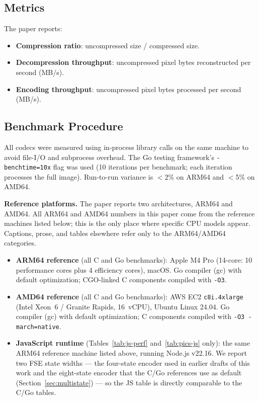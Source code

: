 \documentclass[journal]{IEEEtran}
\begin{document}
\subsection{Metrics}

The paper reports:
\begin{itemize}
  \item \textbf{Compression ratio}: uncompressed size / compressed size.
  \item \textbf{Decompression throughput}: uncompressed pixel bytes
  reconstructed per second (MB/s).
  \item \textbf{Encoding throughput}: uncompressed pixel bytes processed per
  second (MB/s).
\end{itemize}

\subsection{Benchmark Procedure}
\label{subsec:bench-procedure}

All codecs were measured using in-process library calls on the same machine to
avoid file-I/O and subprocess overhead. The Go testing framework's
\texttt{-benchtime=10x} flag was used (10 iterations per benchmark; each
iteration processes the full image). Run-to-run variance is $<$2\% on ARM64
and $<$5\% on AMD64.

\textbf{Reference platforms.} The paper reports two architectures, ARM64 and
AMD64. All ARM64 and AMD64 numbers in this paper come from the reference
machines listed below; this is the only place where specific CPU models
appear. Captions, prose, and tables elsewhere refer only to the ARM64/AMD64
categories.

\begin{itemize}
  \item \textbf{ARM64 reference} (all C and Go benchmarks): Apple M4 Pro
  (14-core: 10 performance cores plus 4 efficiency cores), macOS. Go
  compiler (gc) with default optimization; CGO-linked C components compiled
  with \texttt{-O3}.
  \item \textbf{AMD64 reference} (all C and Go benchmarks): AWS EC2
  \texttt{c8i.4xlarge} (Intel Xeon~6 / Granite Rapids, 16~vCPU), Ubuntu
  Linux 24.04. Go compiler (gc) with default optimization; C components
  compiled with \texttt{-O3 -march=native}.
  \item \textbf{JavaScript runtime} (Tables~\ref{tab:js-perf}
  and~\ref{tab:pics-js} only): the same ARM64 reference machine listed
  above, running Node.js v22.16. We report two FSE state widths --- the
  four-state encoder used in earlier drafts of this work and the
  eight-state encoder that the C/Go references use as default
  (Section~\ref{sec:multistate}) --- so the JS table is directly
  comparable to the C/Go tables.
\end{itemize}
\end{document}
